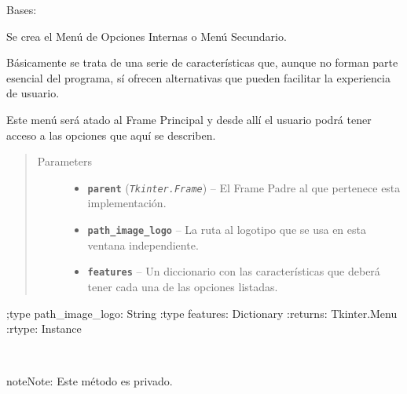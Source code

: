 \documentclass[letterpaper,10pt,english]{sphinxmanual}
\begin{document}
\begin{fulllineitems}
\label{View/Additional/MenuInternalOption/MenuInternalOption:View.Additional.MenuInternalOption.MenuInternalOption.MenuInternalOption}
Bases: 

\begin{DUlineblock}{0em}
\item[] Se crea el Menú de Opciones Internas o Menú Secundario.
\item[] Básicamente se trata de una serie de características que, aunque no
forman parte esencial del programa, sí ofrecen alternativas que pueden
facilitar la experiencia de usuario.
\item[] Este menú será atado al Frame Principal y desde allí el usuario podrá
tener acceso a las opciones que aquí se describen.
\end{DUlineblock}
\begin{quote}\begin{description}
\item[{Parameters}] \leavevmode\begin{itemize}
\item {} 
\textbf{\texttt{parent}} (\emph{\texttt{Tkinter.Frame}}) -- El Frame Padre al que pertenece esta implementación.

\item {} 
\textbf{\texttt{path\_image\_logo}} -- La ruta al logotipo que se usa en esta ventana independiente.

\item {} 
\textbf{\texttt{features}} -- Un diccionario con las características que deberá tener cada una
de las opciones listadas.

\end{itemize}

\end{description}\end{quote}

;type path\_image\_logo: String
:type features: Dictionary 
:returns: Tkinter.Menu
:rtype: Instance

\begin{fulllineitems}
\label{View/Additional/MenuInternalOption/MenuInternalOption:View.Additional.MenuInternalOption.MenuInternalOption.MenuInternalOption._MenuInternalOption__launch_about_toplevel}~
\begin{notice}{note}{Note:}
Este método es privado.
\end{notice}


\end{fulllineitems}
\end{fulllineitems}
\end{document}
